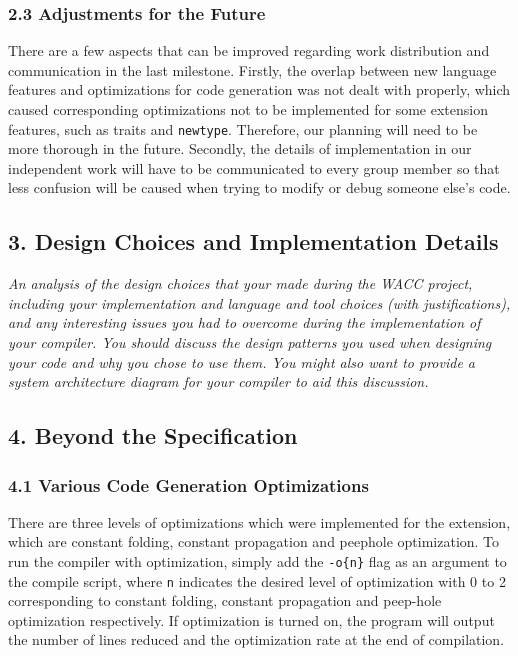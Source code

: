 \documentclass[10pt,a4paper]{report}
\begin{document}
  \subsubsection*{2.3 Adjustments for the Future}
  There are a few aspects that can be improved regarding work distribution and
  communication in the last milestone. Firstly, the overlap between new language
  features and optimizations for code generation was not dealt with properly,
  which caused corresponding optimizations not to be implemented for some
  extension features, such as traits and \texttt{newtype}. Therefore, our
  planning will need to be more thorough in the future. Secondly, the details of
  implementation in our independent work will have to be communicated to every
  group member so that less confusion will be caused when trying to modify or
  debug someone else’s code.



  \subsection*{3. Design Choices and Implementation Details}
  \textit{An analysis of the design choices that your made during the WACC
  project, including your implementation and language and tool choices (with
  justifications), and any interesting issues you had to overcome during the
  implementation of your compiler. You should discuss the design patterns you
  used when designing your code and why you chose to use them. You might also
  want to provide a system architecture diagram for your compiler to aid this
  discussion.}

  \subsection*{4. Beyond the Specification}

  \subsubsection*{4.1 Various Code Generation Optimizations}
  There are three levels of optimizations which were implemented for the
  extension, which are constant folding, constant propagation and peephole
  optimization. To run the compiler with optimization, simply add the
  \texttt{-o\{n\}} flag as an argument to the compile script, where \texttt{n}
  indicates the desired level of optimization with 0 to 2 corresponding to
  constant folding, constant propagation and peep-hole optimization respectively.
  If optimization is turned on, the program will output the number of lines
  reduced and the optimization rate at the end of compilation.
\end{document}
